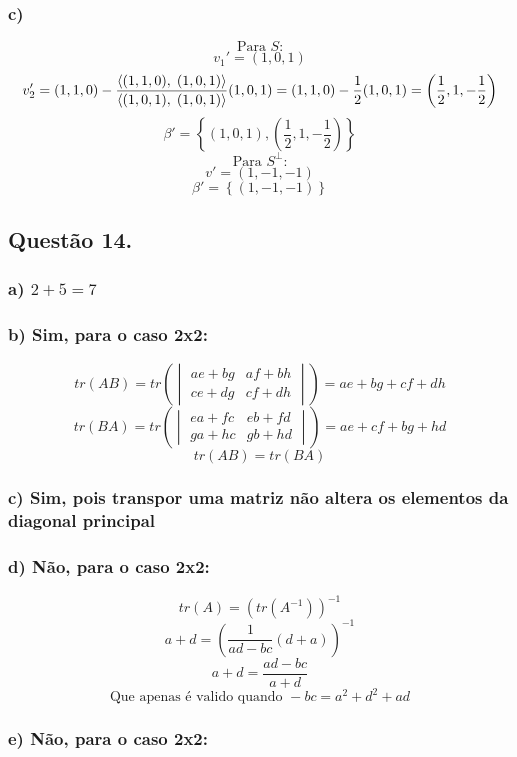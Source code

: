 \documentclass[12pt]{article}
\begin{document}
\subsubsection{c)}

\[\text{Para } S \text{:}\]
\[v_{1}' = (1,0,1)\]
\[v_{2}' = (1,1,0) - \dfrac{\left\langle(1,1,0),\;(1,0,1)\right\rangle}{\left\langle(1,0,1),\;(1,0,1)\right\rangle}(1,0,1) = (1,1,0) - \dfrac{1}{2}(1,0,1) = \left( \dfrac{1}{2}, 1, -\dfrac{1}{2} \right)\]
\[\beta' = \left\lbrace (1,0,1), \left( \dfrac{1}{2}, 1, -\dfrac{1}{2} \right) \right\rbrace\]
\[\text{Para } S^{\perp} \text{:}\]
\[v' = (1,-1,-1)\]
\[\beta' = \left\lbrace (1,-1,-1) \right\rbrace\]

\subsection{Questão 14.}
\subsubsection{a) $2+5=7$}
\subsubsection{b) Sim, para o caso 2x2:}

\[tr(AB) = tr\left( \begin{vmatrix} ae+bg&af+bh \\ ce+dg&cf+dh \end{vmatrix} \right) = ae+bg+cf+dh\]
\[tr(BA) = tr\left( \begin{vmatrix} ea+fc&eb+fd \\ ga+hc&gb+hd \end{vmatrix} \right) = ae+cf+bg+hd\]
\[tr(AB) = tr(BA)\]

\subsubsection{c) Sim, pois transpor uma matriz não altera os elementos da diagonal principal}
\subsubsection{d) Não, para o caso 2x2:}

\[tr(A) = (tr(A^{-1}))^{-1}\]
\[a+d = \left( \dfrac{1}{ad-bc}(d+a) \right)^{-1}\]
\[a+d = \dfrac{ad-bc}{a+d}\]
\[\text{Que apenas é valido quando } -bc = a^{2}+d^{2}+ad\]

\subsubsection{e) Não, para o caso 2x2:}
\end{document}
